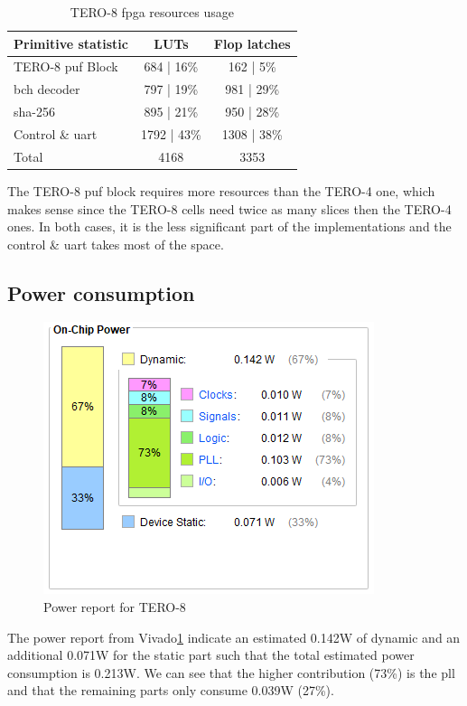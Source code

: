 \begin{table}[H]
    \centering
    \begin{tabular}{|l|c|c|}
         \hline
         \textbf{Primitive statistic} & \textbf{LUTs} & \textbf{Flop latches} \\
         \hline
         TERO-8 \acrshort{puf} Block & 684 | 16\% & 162 | 5\% \\
         \hline
         \acrshort{bch} decoder & 797 | 19\% & 981 | 29\%\\
         \hline
         \acrshort{sha}-256 & 895 | 21\% & 950 | 28\%\\
         \hline
         Control \& \acrshort{uart} & 1792 | 43\% & 1308 | 38\%\\       
         \hline
         Total & 4168 & 3353\\
         \hline
    \end{tabular}
    \caption{TERO-8 \acrshort{fpga} resources usage}
    \label{tab:tero_8_fpga_area_usage}
\end{table}

The TERO-8 \acrshort{puf} block requires more resources than the TERO-4 one, which makes sense since the TERO-8 cells need twice as many slices then the TERO-4 ones. In both cases, it is the less significant part of the implementations and the control \& \acrshort{uart} takes most of the space.

\subsection{Power consumption}
\label{subsec:fpga_usage_pwr}

\begin{figure}[H]
    \centering
    \includegraphics[width=0.7\linewidth]{images/power_usage.png}
    \caption{Power report for TERO-8}
    \label{fig:tero_8_power_usage}
\end{figure}

The power report from Vivado\ref{fig:tero_8_power_usage} indicate an estimated 0.142W of dynamic and an additional 0.071W for the static part such that the total estimated power consumption is 0.213W. We can see that the higher contribution (73\%) is the \acrfull{pll} and that the remaining parts only consume 0.039W (27\%).


